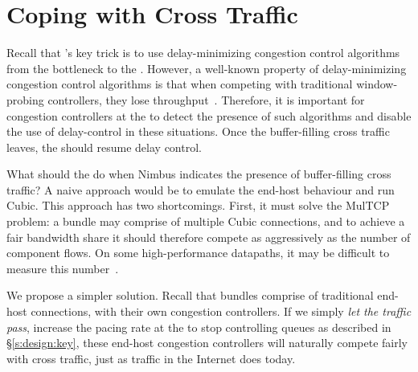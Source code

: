 \section{Coping with Cross Traffic}\label{s:queue-ctl}

Recall that \name's key trick is to use delay-minimizing congestion control algorithms from the bottleneck to the \inbox.
However, a well-known property of delay-minimizing congestion control algorithms is that when competing with traditional window-probing controllers, they lose throughput~\cite{copa}.
Therefore, it is important for congestion controllers at the \inbox to detect the presence of such algorithms and disable the use of delay-control in these situations.
Once the buffer-filling cross traffic leaves, the \inbox should resume delay control.

What should the \inbox do when Nimbus indicates the presence of buffer-filling cross traffic?
A naive approach would be to emulate the end-host behaviour and run Cubic. This approach has two shortcomings.
First, it must solve the MulTCP~\cite{multcp} problem: a bundle may comprise of multiple Cubic connections, and to achieve a fair bandwidth share it should therefore compete as aggressively as the number of component flows. 
On some high-performance datapaths, it may be difficult to measure this number~\cite{heavy-hitters}.

We propose a simpler solution.
Recall that bundles comprise of traditional end-host connections, with their own congestion controllers. 
If we simply \emph{let the traffic pass}, \ie increase the pacing rate at the \inbox to stop controlling queues as described in \S\ref{s:design:key}, these end-host congestion controllers will naturally compete fairly with cross traffic, just as traffic in the Internet does today. 

